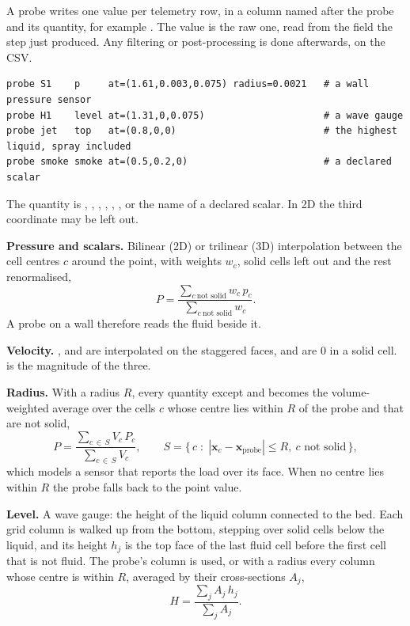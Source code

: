 \documentclass[10pt,a4paper]{article}
\newcommand{\code}[1]{\texttt{\detokenize{#1}}}
\begin{document}
A probe writes one value per telemetry row, in a column named after the probe and its quantity, for example
\code{S1_p}. The value is the raw one, read from the field the step just produced. Any filtering or post-processing
is done afterwards, on the CSV.
\begin{lstlisting}[style=ex]
probe S1    p     at=(1.61,0.003,0.075) radius=0.0021   # a wall pressure sensor
probe H1    level at=(1.31,0,0.075)                     # a wave gauge
probe jet   top   at=(0.8,0,0)                          # the highest liquid, spray included
probe smoke smoke at=(0.5,0.2,0)                        # a declared scalar
\end{lstlisting}
The quantity is \code{p}, \code{u}, \code{v}, \code{w}, \code{speed}, \code{level}, \code{top} or the name of a
declared scalar. In 2D the third coordinate may be left out.

\textbf{Pressure and scalars.} Bilinear (2D) or trilinear (3D) interpolation between the cell centres $c$ around the
point, with weights $w_c$, solid cells left out and the rest renormalised,
\begin{equation*}
  P = \frac{\sum_{c\ \text{not solid}} w_c\,p_c}{\sum_{c\ \text{not solid}} w_c} .
\end{equation*}
A probe on a wall therefore reads the fluid beside it.

\textbf{Velocity.} \code{u}, \code{v} and \code{w} are interpolated on the staggered faces, and are 0 in a solid cell.
\code{speed} is the magnitude of the three.

\textbf{Radius.} With a radius $R$, every quantity except \code{level} and \code{top} becomes the volume-weighted
average over the cells $c$ whose centre lies within $R$ of the probe and that are not solid,
\begin{equation*}
  P = \frac{\sum_{c\,\in\,S} V_c\,P_c}{\sum_{c\,\in\,S} V_c}, \qquad
  S = \bigl\{\, c \;:\; |\mathbf{x}_c - \mathbf{x}_{\mathrm{probe}}| \le R,\ c \text{ not solid} \,\bigr\},
\end{equation*}
which models a sensor that reports the load over its face. When no centre lies within $R$ the probe falls back to the
point value.

\textbf{Level.} A wave gauge: the height of the liquid column connected to the bed. Each grid column is walked up from
the bottom, stepping over solid cells below the liquid, and its height $h_j$ is the top face of the last fluid cell
before the first cell that is not fluid. The probe's column is used, or with a radius every column whose centre is
within $R$, averaged by their cross-sections $A_j$,
\begin{equation*}
  H = \frac{\sum_j A_j\,h_j}{\sum_j A_j}.
\end{equation*}
\end{document}
